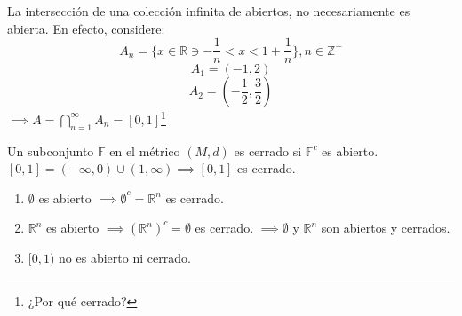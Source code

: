 \begin{remark}
La intersección de una colección infinita de abiertos, no necesariamente es abierta. En efecto, considere: $$A_n=\{x\in\mathbb{R}\ni -\frac{1}{n}<x<1+\frac{1}{n}\}, n\in\mathbb{Z}^+$$
$$A_1=(-1,2)$$
$$A_2=(-\frac{1}{2},\frac{3}{2})$$
$\implies A =\bigcap_{n=1}^\infty A_n=[0,1]$\footnote{¿Por qué cerrado?}
\end{remark}

\begin{definition}
Un subconjunto $\mathbb{F}$ en el métrico $(M,d)$ es cerrado si $\mathbb{F}^c$ es abierto. 
$[0,1]=(-\infty,0)\cup (1,\infty)\implies [0,1]$ es cerrado. 
\end{definition}

\begin{example}
\begin{enumerate}
    \item $\emptyset$ es abierto $\implies \emptyset^c=\mathbb{R}^n$ es cerrado. 
    \item $\mathbb{R}^n$ es abierto $\implies (\mathbb{R}^n)^c=\emptyset$ es cerrado. $\implies\emptyset$ y $\mathbb{R}^n$ son abiertos y cerrados. 
    \item $[0,1)$ no es abierto ni cerrado. 
    
\end{enumerate}
\end{example}